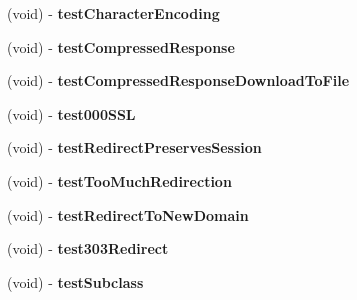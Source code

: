 \begin{DoxyCompactItemize}
\item 
\hypertarget{interface_a_s_i_h_t_t_p_request_tests_ae25e5af72786306a726678b3e50efa71}{
(void) -\/ {\bfseries test\-Character\-Encoding}}
\label{interface_a_s_i_h_t_t_p_request_tests_ae25e5af72786306a726678b3e50efa71}

\item 
\hypertarget{interface_a_s_i_h_t_t_p_request_tests_ae884e3724fa16e86e2c9f202fafb0832}{
(void) -\/ {\bfseries test\-Compressed\-Response}}
\label{interface_a_s_i_h_t_t_p_request_tests_ae884e3724fa16e86e2c9f202fafb0832}

\item 
\hypertarget{interface_a_s_i_h_t_t_p_request_tests_ad9fe5125c3c071c35369d0df17222250}{
(void) -\/ {\bfseries test\-Compressed\-Response\-Download\-To\-File}}
\label{interface_a_s_i_h_t_t_p_request_tests_ad9fe5125c3c071c35369d0df17222250}

\item 
\hypertarget{interface_a_s_i_h_t_t_p_request_tests_a91af84b41f3a46f64d16095adb340214}{
(void) -\/ {\bfseries test000\-S\-S\-L}}
\label{interface_a_s_i_h_t_t_p_request_tests_a91af84b41f3a46f64d16095adb340214}

\item 
\hypertarget{interface_a_s_i_h_t_t_p_request_tests_a3132c64a767dc4789eedb611544874b7}{
(void) -\/ {\bfseries test\-Redirect\-Preserves\-Session}}
\label{interface_a_s_i_h_t_t_p_request_tests_a3132c64a767dc4789eedb611544874b7}

\item 
\hypertarget{interface_a_s_i_h_t_t_p_request_tests_abdde777c6d2c53c38bbbd414f01ab11c}{
(void) -\/ {\bfseries test\-Too\-Much\-Redirection}}
\label{interface_a_s_i_h_t_t_p_request_tests_abdde777c6d2c53c38bbbd414f01ab11c}

\item 
\hypertarget{interface_a_s_i_h_t_t_p_request_tests_a0e46e6d0e9b2075145255c89cb0f23ae}{
(void) -\/ {\bfseries test\-Redirect\-To\-New\-Domain}}
\label{interface_a_s_i_h_t_t_p_request_tests_a0e46e6d0e9b2075145255c89cb0f23ae}

\item 
\hypertarget{interface_a_s_i_h_t_t_p_request_tests_a486f80b7859c2c3ea72e06a28fdcf789}{
(void) -\/ {\bfseries test303\-Redirect}}
\label{interface_a_s_i_h_t_t_p_request_tests_a486f80b7859c2c3ea72e06a28fdcf789}

\item 
\hypertarget{interface_a_s_i_h_t_t_p_request_tests_aeb6e4b4f2fc9f3a74b3cd2a6c42341d5}{
(void) -\/ {\bfseries test\-Subclass}}
\label{interface_a_s_i_h_t_t_p_request_tests_aeb6e4b4f2fc9f3a74b3cd2a6c42341d5}


\end{DoxyCompactItemize}
